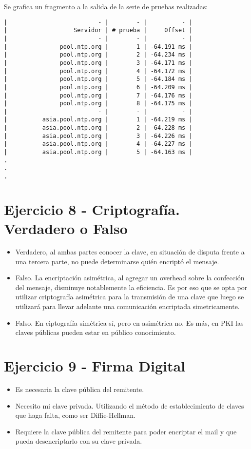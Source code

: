 Se grafica un fragmento a la salida de la serie de pruebas realizadas:

\begin{lstlisting}
|                          - |        - |          - |
|                   Servidor | # prueba |     Offset |
|                          - |        - |          - |
|               pool.ntp.org |        1 | -64.191 ms |
|               pool.ntp.org |        2 | -64.234 ms |
|               pool.ntp.org |        3 | -64.171 ms |
|               pool.ntp.org |        4 | -64.172 ms |
|               pool.ntp.org |        5 | -64.184 ms |
|               pool.ntp.org |        6 | -64.209 ms |
|               pool.ntp.org |        7 | -64.176 ms |
|               pool.ntp.org |        8 | -64.175 ms |
|                          - |        - |          - |
|          asia.pool.ntp.org |        1 | -64.219 ms |
|          asia.pool.ntp.org |        2 | -64.228 ms |
|          asia.pool.ntp.org |        3 | -64.226 ms |
|          asia.pool.ntp.org |        4 | -64.227 ms |
|          asia.pool.ntp.org |        5 | -64.163 ms |
.
.
.
\end{lstlisting}

\section{Ejercicio 8 - Criptografía. Verdadero o Falso}

\begin{itemize}
    \item Verdadero, al ambas partes conocer la clave, en situación de disputa frente a una tercera parte, no puede determinarse quién encriptó el mensaje.
    \item Falso. La encriptación asimétrica, al agregar un overhead sobre la confección del mensaje, disminuye notablemente la eficiencia. Es por eso que se opta por utilizar criptografía asimétrica para la transmisión de una clave que luego se utilizará para llevar adelante una comunicación encriptada simetricamente.
    \item Falso. En ciptografía simétrica sí, pero en asimétrica no. Es más, en PKI las claves públicas pueden estar en público conocimiento.
\end{itemize}

\section{Ejercicio 9 - Firma Digital}

\begin{itemize}
    \item Es necesaria la clave pública del remitente.
    \item Necesito mi clave privada. Utilizando el método de establecimiento de claves que haga falta, como ser Diffie-Hellman.
    \item Requiere la clave pública del remitente para poder encriptar el mail y que pueda desencriptarlo con su clave privada.
\end{itemize}


